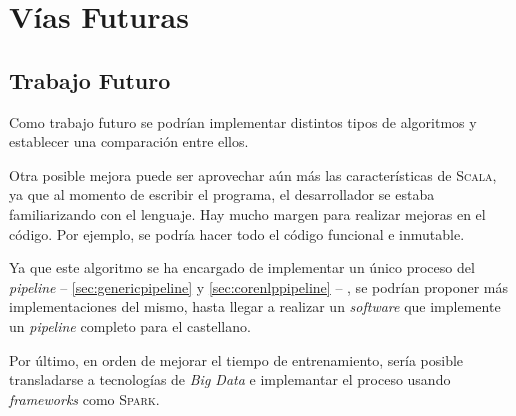 \chapter{Vías Futuras}
\label{ch:future}

\section{Trabajo Futuro}
\label{sec:future}

Como trabajo futuro se podrían implementar distintos tipos de algoritmos y
establecer una comparación entre ellos.

Otra posible mejora puede ser aprovechar aún más las características de
\textsc{Scala}, ya que al momento de escribir el programa, el desarrollador se
estaba familiarizando con el lenguaje. Hay mucho margen para realizar mejoras en
el código. Por ejemplo, se podría hacer todo el código funcional e
inmutable.

Ya que este algoritmo se ha encargado de implementar un único proceso del
\emph{pipeline} -- \autoref{sec:genericpipeline} y \autoref{sec:corenlppipeline}
-- , se podrían proponer más implementaciones del mismo, hasta llegar a realizar
un \emph{software} que implemente un \emph{pipeline} completo para el
castellano.

Por último, en orden de mejorar el tiempo de entrenamiento, sería posible
transladarse a tecnologías de \emph{Big Data} e implemantar el proceso usando
\emph{frameworks} como \textsc{Spark}.

